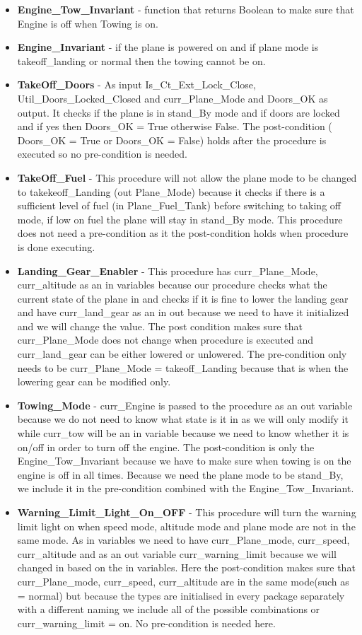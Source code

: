 \documentclass{llncs}
\begin{document}
\begin{itemize}
\item \textbf{Engine\_Tow\_Invariant} - function that returns Boolean to make sure that Engine is off when Towing is on.
\item \textbf{Engine\_Invariant} - if the plane is powered on and if plane mode is takeoff\_landing or normal then the towing cannot be on. 
\item \textbf{TakeOff\_Doors} - As input Is\_Ct\_Ext\_Lock\_Close, Util\_Doors\_Locked\_Closed  and curr\_Plane\_Mode and Doors\_OK as output. It checks if the plane is in stand\_By mode and if doors are locked and if yes then Doors\_OK = True otherwise False. The post-condition ( Doors\_OK = True or Doors\_OK = False) holds after the procedure is executed so no pre-condition is needed.
\item \textbf{TakeOff\_Fuel} - This procedure will not allow the plane mode to be changed to takekeoff\_Landing (out Plane\_Mode) because  it checks if there is a sufficient level of fuel (in Plane\_Fuel\_Tank) before switching to taking off mode, if low on fuel the plane will stay in stand\_By mode. This procedure does not need a pre-condition as it the post-condition holds when procedure is done executing.
\item \textbf{Landing\_Gear\_Enabler} - This procedure has curr\_Plane\_Mode, curr\_altitude as an in variables because our procedure checks what the current state of the plane in and checks if it is fine to lower the landing gear and have curr\_land\_gear as an in out because we need to have it initialized and we will change the value. The post condition makes sure that curr\_Plane\_Mode does not change when procedure is executed and curr\_land\_gear can be either lowered or unlowered. The pre-condition only needs to be curr\_Plane\_Mode = takeoff\_Landing because that is when the lowering gear can be modified only.  
\item \textbf{Towing\_Mode} -  curr\_Engine is passed to the procedure as an out variable because we do not need to know what state is it in as we will only modify it while curr\_tow will be an in variable because we need to know whether it is on/off in order to turn off the engine. The post-condition is only the Engine\_Tow\_Invariant because we have to make sure when towing is on the engine is off in all times. Because we need the plane mode to be stand\_By, we include it in the pre-condition combined with the Engine\_Tow\_Invariant.
\item \textbf{Warning\_Limit\_Light\_On\_OFF} - This procedure will turn the warning limit light on when speed mode, altitude mode and plane mode are not in the same mode. As in variables we need to have curr\_Plane\_mode,  curr\_speed, curr\_altitude and as an out variable curr\_warning\_limit because we will changed in based on the in variables. Here the post-condition makes sure that curr\_Plane\_mode,  curr\_speed, curr\_altitude are in the same mode(such as = normal) but because the types are initialised in every package separately with a different naming we include all of the possible combinations or curr\_warning\_limit = on. No pre-condition is needed here.
\end{itemize}
\end{document}
